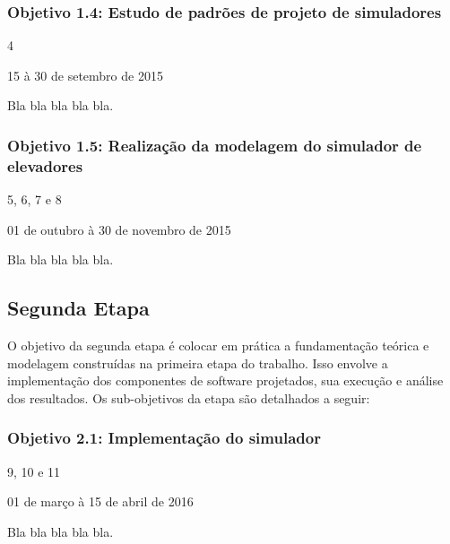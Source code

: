 \subsubsection{\textbf{Objetivo 1.4}: Estudo de padrões de projeto de simuladores}

\begin{description}[leftmargin=!,labelwidth=\widthof{\bfseries Descrição}]
  \item[Iterações] 4
  \item[Período]   15 à 30 de setembro de 2015
  \item[Descrição] Bla bla bla bla bla.
\end{description}

\subsubsection{\textbf{Objetivo 1.5}: Realização da modelagem do simulador de elevadores}

\begin{description}[leftmargin=!,labelwidth=\widthof{\bfseries Descrição}]
  \item[Iterações] 5, 6, 7 e 8
  \item[Período]   01 de outubro à 30 de novembro de 2015
  \item[Descrição] Bla bla bla bla bla.
\end{description}

\subsection{Segunda Etapa}

O objetivo da segunda etapa é colocar em prática a fundamentação teórica e modelagem construídas na primeira etapa do trabalho. Isso envolve a implementação dos componentes de software projetados, sua execução e análise dos resultados. Os sub-objetivos da etapa são detalhados a seguir:

\subsubsection{\textbf{Objetivo 2.1}: Implementação do simulador}

\begin{description}[leftmargin=!,labelwidth=\widthof{\bfseries Descrição}]
  \item[Iterações] 9, 10 e 11
  \item[Período]   01 de março à 15 de abril de 2016
  \item[Descrição] Bla bla bla bla bla.
\end{description}

